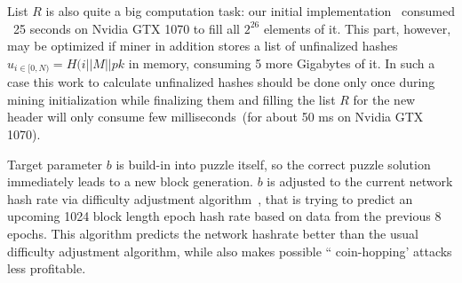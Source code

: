 List $R$ is also quite a big computation task: our initial implementation~\cite{ergoMiner}
consumed ~25 seconds on Nvidia GTX 1070 to fill all $2^{26}$ elements of it.
This part, however, may be optimized if miner in addition stores a list of unfinalized hashes $u_{i \in [0,N)}=H(i||M||pk$
in memory, consuming 5 more Gigabytes of it. In such a case this work to calculate unfinalized hashes should
be done only once during mining initialization while finalizing them and filling the list $R$
for the new header will only consume few milliseconds~(for about 50 ms on Nvidia GTX 1070).

Target parameter $b$ is build-in into puzzle itself, so the correct puzzle solution immediately
leads to a new block generation. $b$ is adjusted to the current network hash rate via difficulty adjustment
algorithm~\cite{meshkov2017short}, that is trying to predict an upcoming 1024 block length
epoch hash rate based on data from the previous 8 epochs.
This algorithm predicts the network hashrate better than the usual difficulty adjustment algorithm,
while also makes possible `` coin-hopping' attacks less profitable.
